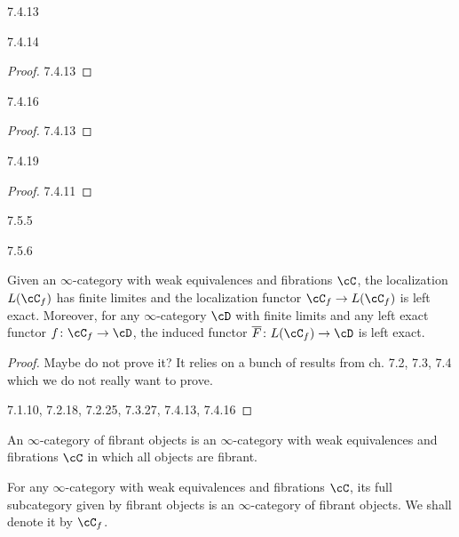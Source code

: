\documentclass[a4paper,12pt]{scrartcl}
\begin{document}
\begin{prop}
  7.4.13
\end{prop}

\begin{cor}
  7.4.14
\end{cor}
\begin{proof}
  7.4.13
\end{proof}

\begin{prop}
  7.4.16
\end{prop}
\begin{proof}
  7.4.13
\end{proof}

\begin{prop}
  7.4.19
\end{prop}
\begin{proof}
  7.4.11
\end{proof}

\begin{prop}
  7.5.5
\end{prop}

\begin{prop}\label{756}
  7.5.6

  Given an $\infty$-category with weak equivalences and fibrations $\cC$, the
  localization $L(\cC_f)$ has finite limites and the localization functor
  $\cC_f\rightarrow L(\cC_f)$ is left exact. Moreover, for any $\infty$-category
  $\cD$ with finite limits and any left exact functor
  $f\colon\cC_f\rightarrow\cD$, the induced functor $\overline{F}\colon
  L(\cC_f)\rightarrow\cD$ is left exact.
\end{prop}
\begin{proof}
  Maybe do not prove it? It relies on a bunch of results from ch. 7.2, 7.3, 7.4
  which we do not really want to prove.

  7.1.10, 7.2.18, 7.2.25, 7.3.27, 7.4.13, 7.4.16
\end{proof}

\begin{defn}
  An $\infty$-category of fibrant objects is an $\infty$-category with weak
  equivalences and fibrations $\cC$ in which all objects are fibrant.
\end{defn}

\begin{exmp}
  For any $\infty$-category with weak equivalences and fibrations $\cC$, its
  full subcategory given by fibrant objects is an $\infty$-category of fibrant
  objects. We shall denote it by $\cC_f$.
\end{exmp}
\end{document}
